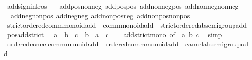 \begin{isabellebody}
\endisatagproof
{\isafoldproof}%
%
\isadelimproof
\isanewline
%
\endisadelimproof
\isanewline
{}\isamarkupfalse%
\ add{\isacharunderscore}{\kern0pt}sign{\isacharunderscore}{\kern0pt}intros\ {\isacharequal}{\kern0pt}\isanewline
\ \ add{\isacharunderscore}{\kern0pt}pos{\isacharunderscore}{\kern0pt}nonneg\ add{\isacharunderscore}{\kern0pt}pos{\isacharunderscore}{\kern0pt}pos\ add{\isacharunderscore}{\kern0pt}nonneg{\isacharunderscore}{\kern0pt}pos\ add{\isacharunderscore}{\kern0pt}nonneg{\isacharunderscore}{\kern0pt}nonneg\isanewline
\ \ add{\isacharunderscore}{\kern0pt}neg{\isacharunderscore}{\kern0pt}nonpos\ add{\isacharunderscore}{\kern0pt}neg{\isacharunderscore}{\kern0pt}neg\ add{\isacharunderscore}{\kern0pt}nonpos{\isacharunderscore}{\kern0pt}neg\ add{\isacharunderscore}{\kern0pt}nonpos{\isacharunderscore}{\kern0pt}nonpos\isanewline
\isanewline
{}\isamarkupfalse%
\isanewline
\isanewline
{}\isamarkupfalse%
\ strict{\isacharunderscore}{\kern0pt}ordered{\isacharunderscore}{\kern0pt}comm{\isacharunderscore}{\kern0pt}monoid{\isacharunderscore}{\kern0pt}add\ {\isacharequal}{\kern0pt}\ comm{\isacharunderscore}{\kern0pt}monoid{\isacharunderscore}{\kern0pt}add\ {\isacharplus}{\kern0pt}\ strict{\isacharunderscore}{\kern0pt}ordered{\isacharunderscore}{\kern0pt}ab{\isacharunderscore}{\kern0pt}semigroup{\isacharunderscore}{\kern0pt}add\isanewline
{}\isanewline
\isanewline
{}\isamarkupfalse%
\ pos{\isacharunderscore}{\kern0pt}add{\isacharunderscore}{\kern0pt}strict{\isacharcolon}{\kern0pt}\ {\isachardoublequoteopen}{}\ {\isacharless}{\kern0pt}\ a\ {\isasymLongrightarrow}\ b\ {\isacharless}{\kern0pt}\ c\ {\isasymLongrightarrow}\ b\ {\isacharless}{\kern0pt}\ a\ {\isacharplus}{\kern0pt}\ c{\isachardoublequoteclose}\isanewline
%
\isadelimproof
\ \ %
\endisadelimproof
%
\isatagproof
{}\isamarkupfalse%
\ add{\isacharunderscore}{\kern0pt}strict{\isacharunderscore}{\kern0pt}mono\ {\isacharbrackleft}{\kern0pt}of\ {}\ a\ b\ c{\isacharbrackright}{\kern0pt}\ \isamarkupfalse%
\ simp%
\endisatagproof
{\isafoldproof}%
%
\isadelimproof
\isanewline
%
\endisadelimproof
\isanewline
{}\isamarkupfalse%
\isanewline
\isanewline
{}\isamarkupfalse%
\ ordered{\isacharunderscore}{\kern0pt}cancel{\isacharunderscore}{\kern0pt}comm{\isacharunderscore}{\kern0pt}monoid{\isacharunderscore}{\kern0pt}add\ {\isacharequal}{\kern0pt}\ ordered{\isacharunderscore}{\kern0pt}comm{\isacharunderscore}{\kern0pt}monoid{\isacharunderscore}{\kern0pt}add\ {\isacharplus}{\kern0pt}\ cancel{\isacharunderscore}{\kern0pt}ab{\isacharunderscore}{\kern0pt}semigroup{\isacharunderscore}{\kern0pt}add\isanewline

\end{isabellebody}

